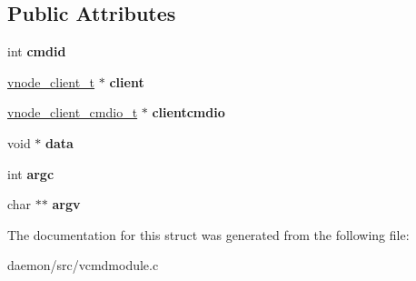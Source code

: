 \subsection*{Public Attributes}
\begin{DoxyCompactItemize}
\item 
\hypertarget{structvcmd__cmdreq__t_ab73a2086fc1eae9440a03ad02e92013d}{int {\bfseries cmdid}}\label{structvcmd__cmdreq__t_ab73a2086fc1eae9440a03ad02e92013d}

\item 
\hypertarget{structvcmd__cmdreq__t_a9d64994e85ee59a1214c2c342261c146}{\hyperlink{structvnode__client}{vnode\+\_\+client\+\_\+t} $\ast$ {\bfseries client}}\label{structvcmd__cmdreq__t_a9d64994e85ee59a1214c2c342261c146}

\item 
\hypertarget{structvcmd__cmdreq__t_a4ff1271b6fb87e529e45af4bffe1a51b}{\hyperlink{structvnode__client__cmdio__t}{vnode\+\_\+client\+\_\+cmdio\+\_\+t} $\ast$ {\bfseries clientcmdio}}\label{structvcmd__cmdreq__t_a4ff1271b6fb87e529e45af4bffe1a51b}

\item 
\hypertarget{structvcmd__cmdreq__t_acc9eda7f75fd312c3e8afcc820f9d187}{void $\ast$ {\bfseries data}}\label{structvcmd__cmdreq__t_acc9eda7f75fd312c3e8afcc820f9d187}

\item 
\hypertarget{structvcmd__cmdreq__t_a0d4019ba358f5e5fd259994c3c4c604d}{int {\bfseries argc}}\label{structvcmd__cmdreq__t_a0d4019ba358f5e5fd259994c3c4c604d}

\item 
\hypertarget{structvcmd__cmdreq__t_a86b8a5f3efeaa5d612ba9b9fda684af1}{char $\ast$$\ast$ {\bfseries argv}}\label{structvcmd__cmdreq__t_a86b8a5f3efeaa5d612ba9b9fda684af1}

\end{DoxyCompactItemize}


The documentation for this struct was generated from the following file\+:\begin{DoxyCompactItemize}
\item 
daemon/src/vcmdmodule.\+c\end{DoxyCompactItemize}
